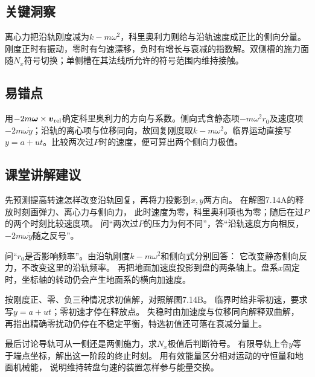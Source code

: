 \documentclass[UTF8,fontset=fandol,a4paper,11pt]{ctexart}
\begin{document}


\subsection*{关键洞察}

离心力把沿轨刚度减为$k-m\omega^2$，科里奥利力则给与沿轨速度成正比的侧向分量。刚度正时有振动，零时有匀速漂移，负时有增长与衰减的指数解。双侧槽的施力面随$N_x$符号切换；单侧槽在其法线所允许的符号范围内维持接触。




\subsection*{易错点}

用$-2m\boldsymbol\omega\times\boldsymbol v_{\rm rel}$确定科里奥利力的方向与系数。侧向式含静态项$-m\omega^2r_0$及速度项$-2m\omega\dot y$；沿轨的离心项与位移同向，故回复刚度取$k-m\omega^2$。临界运动直接写$y=a+ut$。比较两次过$P$时的速度，便可算出两个侧向力极值。




\subsection*{课堂讲解建议}

先预测提高转速怎样改变沿轨回复，再将力投影到$x,y$两方向。
在解图7.14A的释放时刻画弹力、离心力与侧向力，
此时速度为零，科里奥利项也为零；随后在过$P$的两个时刻比较速度项。
问“两次过$P$的压力为何不同”，答“沿轨速度方向相反，$-2m\omega\dot y$随之反号”。

问“$r_0$是否影响频率”。由沿轨刚度$k-m\omega^2$和侧向式分别回答：
它改变静态侧向反力，不改变这里的沿轨频率。
再把地面加速度投影到盘的两条轴上。盘系$x$固定时，坐标轴的转动仍会产生地面系的横向加速度。

按刚度正、零、负三种情况求初值解，对照解图7.14B。
临界时给非零初速，要求写$y=a+ut$；零初速才停在释放点。
失稳时由加速度与位移同向解释双曲解，
再指出精确零扰动仍停在不稳定平衡，特选初值还可落在衰减分量上。

最后讨论导轨可从一侧还是两侧施力，求$N_x$极值后判断符号。
有限导轨上令$y$等于端点坐标，解出这一阶段的终止时刻。
用有效能量区分相对运动的守恒量和地面机械能，
说明维持转盘匀速的装置怎样参与能量交换。
\end{document}
